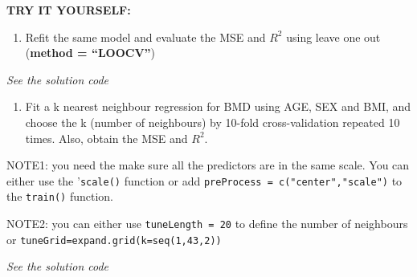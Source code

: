 \documentclass[
]{book}
\newenvironment{Shaded}{\begin{snugshade}}{\end{snugshade}}
\newcommand{\AttributeTok}[1]{\textcolor[rgb]{0.13,0.29,0.53}{#1}}
\newcommand{\CommentTok}[1]{\textcolor[rgb]{0.56,0.35,0.01}{\textit{#1}}}
\newcommand{\FunctionTok}[1]{\textcolor[rgb]{0.13,0.29,0.53}{\textbf{#1}}}
\newcommand{\NormalTok}[1]{#1}
\newcommand{\OtherTok}[1]{\textcolor[rgb]{0.56,0.35,0.01}{#1}}
\newcommand{\SpecialCharTok}[1]{\textcolor[rgb]{0.81,0.36,0.00}{\textbf{#1}}}
\newcommand{\StringTok}[1]{\textcolor[rgb]{0.31,0.60,0.02}{#1}}
\providecommand{\tightlist}{%
  \setlength{\itemsep}{0pt}\setlength{\parskip}{0pt}}
\begin{document}
\textbf{TRY IT YOURSELF:}

\begin{enumerate}
\def\labelenumi{\arabic{enumi})}
\tightlist
\item
  Refit the same model and evaluate the MSE and \(R^2\) using leave one out (\textbf{method = ``LOOCV''})
\end{enumerate}

\emph{See the solution code}

\begin{Shaded}
\end{Shaded}

\begin{enumerate}
\def\labelenumi{\arabic{enumi})}
\setcounter{enumi}{1}
\tightlist
\item
  Fit a k nearest neighbour regression for BMD using AGE, SEX and BMI,
  and choose the k (number of neighbours) by 10-fold cross-validation
  repeated 10 times. Also, obtain the MSE and \(R^2\).
\end{enumerate}

NOTE1: you need the make sure all the predictors are in the same scale. You can
either use the '\texttt{scale()} function or add \texttt{preProcess\ =\ c("center","scale")} to
the \texttt{train()} function.

NOTE2: you can either use \texttt{tuneLength\ =\ 20} to define the number of neighbours
or \texttt{tuneGrid=expand.grid(k=seq(1,43,2))}

\emph{See the solution code}
\end{document}
